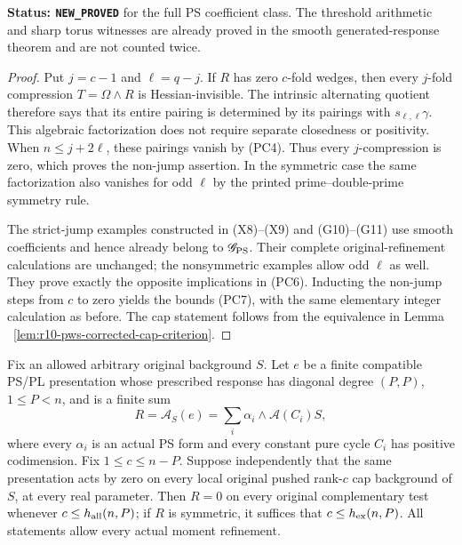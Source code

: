 \noindent\textbf{Status: \texttt{NEW\_PROVED}} for the
full PS coefficient class.  The threshold arithmetic and
sharp torus witnesses are already proved in the smooth
generated-response theorem and are not counted twice.

\begin{proof}
Put $j=c-1$ and $\ell=q-j$.  If $R$ has zero
$c$-fold wedges, then every $j$-fold compression
$T=\Omega\wedge R$ is Hessian-invisible.  The intrinsic
alternating quotient therefore says that its entire
pairing is determined by its pairings with
$s_{\ell,\ell}\gamma$.  This algebraic factorization
does not require separate closedness or positivity.
When $n\le j+2\ell$, these pairings vanish by (PC4).
Thus every $j$-compression is zero, which proves the
non-jump assertion.  In the symmetric case the same
factorization also vanishes for odd $\ell$ by the
printed prime--double-prime symmetry rule.

The strict-jump examples constructed in (X8)--(X9) and
(G10)--(G11) use smooth coefficients and hence already
belong to $\mathscr G_{\rm PS}$.  Their complete
original-refinement calculations are unchanged; the
nonsymmetric examples allow odd $\ell$ as well.
They prove exactly the opposite implications in (PC6).
Inducting the non-jump steps from $c$ to zero yields
the bounds (PC7), with the same elementary integer
calculation as before.  The cap statement follows from
the equivalence in Lemma
~\ref{lem:r10-pws-corrected-cap-criterion}.
\end{proof}

\begin{corollary}
\label{cor:r10-pws-variable-relation-reconstruction}
Fix an allowed arbitrary original background $S$.  Let
$e$ be a finite compatible PS/PL presentation whose
prescribed response has diagonal degree $(P,P)$,
$1\le P<n$, and is a finite sum
\[
                R=\mathcal A_S(e)
                       =\sum_i\alpha_i\wedge\mathcal A(C_i)S,
 \tag{PC8}
\]
where every $\alpha_i$ is an actual PS form and every
constant pure cycle $C_i$ has positive codimension.
Fix $1\le c\le n-P$.  Suppose independently that the
same presentation acts by zero on every local original
pushed rank-$c$ cap background of $S$, at every real
parameter.  Then $R=0$ on every original complementary
test whenever $c\le h_{\rm all}(n,P)$; if $R$ is
symmetric, it suffices that $c\le h_{\rm ex}(n,P)$.
All statements allow every actual moment refinement.
\end{corollary}

